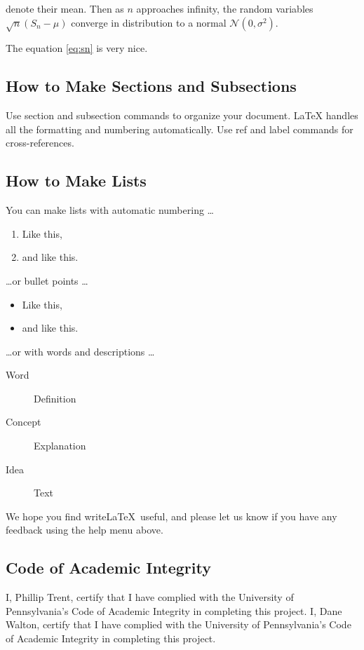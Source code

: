 \documentclass[a4paper]{article}
\begin{document}
denote their mean. Then as $n$ approaches infinity, the random variables $\sqrt{n}(S_n - \mu)$ converge in distribution to a normal $\mathcal{N}(0, \sigma^2)$.

The equation \ref{eq:sn} is very nice.

\subsection{How to Make Sections and Subsections}

Use section and subsection commands to organize your document. \LaTeX{} handles all the formatting and numbering automatically. Use ref and label commands for cross-references.

\subsection{How to Make Lists}

You can make lists with automatic numbering \dots

\begin{enumerate}
\item Like this,
\item and like this.
\end{enumerate}
\dots or bullet points \dots
\begin{itemize}
\item Like this,
\item and like this.
\end{itemize}
\dots or with words and descriptions \dots
\begin{description}
\item[Word] Definition
\item[Concept] Explanation
\item[Idea] Text
\end{description}

We hope you find write\LaTeX\ useful, and please let us know if you have any feedback using the help menu above.


\subsection{Code of Academic Integrity}
I, Phillip Trent, certify that I have complied with the University of Pennsylvania’s Code of Academic Integrity in completing this project.
I, Dane Walton, certify that I have complied with the University of Pennsylvania’s Code of Academic Integrity in completing this project.
\end{document}
